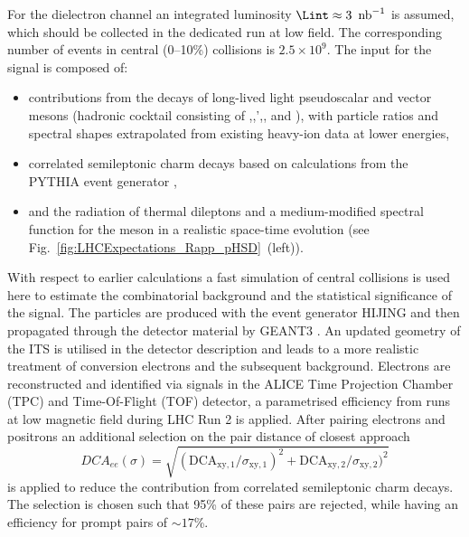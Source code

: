 \documentclass[../report.tex]{subfiles}
\begin{document}
For the dielectron channel an integrated luminosity $\Lint\approx \unit[3]{\Unb^{-1}}$ is assumed, which should be collected in the dedicated \PbPb{} run at low field. The corresponding number of events in central (0--10\%) collisions is $2.5 \times 10^{9}$.  
The input for the signal is composed of:
\begin{itemize}
\item contributions from the decays of long-lived light pseudoscalar and vector mesons (hadronic cocktail consisting of \PGpz,\PGh,\PGh',\PGo, and \PGf), with particle ratios and spectral shapes extrapolated from existing heavy-ion data at lower energies,
\item correlated semileptonic charm decays based on calculations from the PYTHIA event generator \cite{Sjostrand:2006za},
\item and the radiation of thermal dileptons and a medium-modified spectral function for the \PGr meson in a realistic space-time evolution (see Fig.~\ref{fig:LHCExpectations_Rapp_pHSD}~(left)).
\end{itemize}
With respect to earlier calculations \cite{Abelevetal:2014cna,Abelevetal:2014dna,ALICE:2014qrd} a fast simulation of central \PbPb{} collisions is used here to estimate the combinatorial background and the statistical significance of the signal. The particles are produced with the event generator HIJING \cite{Wang:1991hta} and then propagated through the detector material by GEANT3 \cite{Brun:1994aa}. An updated geometry of the ITS is utilised in the detector description and leads to a more realistic treatment of conversion electrons and the subsequent background. 
Electrons are reconstructed and identified via signals in the ALICE Time Projection Chamber (TPC) and Time-Of-Flight (TOF) detector, a parametrised efficiency from runs at low magnetic field during LHC Run 2 is applied. After pairing electrons and positrons an additional selection on the pair distance of closest approach 
\begin{equation}
DCA_{ee}(\sigma)=\sqrt{(\mathrm{DCA}_{\mathrm{xy},1}/\sigma_{\mathrm{xy},1})^2+\mathrm{DCA}_{\mathrm{xy},2}/\sigma_{\mathrm{xy},2})^2}
\end{equation}
is applied to reduce the contribution from correlated semileptonic charm decays. The selection is chosen such that 95\% of these pairs are rejected, while having an efficiency for prompt pairs of $\sim17$\%.
\end{document}
